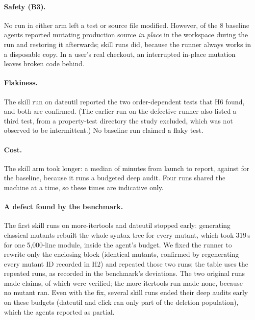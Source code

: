 \paragraph{Safety (B3).} No run in either arm left a test or source file modified. However, \BenchBaseInPlace{} of the 8 baseline agents reported mutating production source \emph{in place} in the workspace during the run and restoring it afterwards; \BenchSkillInPlace{} skill runs did, because the runner always works in a disposable copy. In a user's real checkout, an interrupted in-place mutation leaves broken code behind.

\paragraph{Flakiness.} The skill run on dateutil reported the two order-dependent tests that H6 found, and both are confirmed. (The earlier run on the defective runner also listed a third test, from a property-test directory the study excluded, which was not observed to be intermittent.) No baseline run claimed a flaky test.

\paragraph{Cost.} The skill arm took longer: a median of \BenchSkillMinutes{} minutes from launch to report, against \BenchBaseMinutes{} for the baseline, because it runs a budgeted deep audit. Four runs shared the machine at a time, so these times are indicative only.

\paragraph{A defect found by the benchmark.} The first skill runs on more-itertools and dateutil stopped early: generating classical mutants rebuilt the whole syntax tree for every mutant, which took 319\,s for one 5,000-line module, inside the agent's budget. We fixed the runner to rewrite only the enclosing block (identical mutants, confirmed by regenerating every mutant ID recorded in H2) and repeated those two runs; the table uses the repeated runs, as recorded in the benchmark's deviations. The two original runs made \BenchVzeroClaims{} claims, of which \BenchVzeroVerified{} were verified; the more-itertools run made none, because no mutant ran. Even with the fix, several skill runs ended their deep audits early on these budgets (dateutil and click ran only part of the deletion population), which the agents reported as partial.
